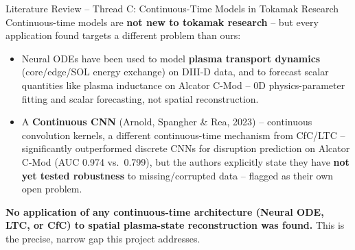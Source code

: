 \documentclass[aspectratio=169]{beamer}
\begin{document}
\begin{frame}{Literature Review -- Thread C: Continuous-Time Models in Tokamak Research}
  \small
  Continuous-time models are \textbf{not new to tokamak research} -- but
  every application found targets a different problem than ours:
  \begin{itemize}
    \item Neural ODEs have been used to model \textbf{plasma transport
      dynamics} (core/edge/SOL energy exchange) on DIII-D data, and to
      forecast scalar quantities like plasma inductance on Alcator C-Mod --
      0D physics-parameter fitting and scalar forecasting, not spatial
      reconstruction.
    \item A \textbf{Continuous CNN} (Arnold, Spangher \& Rea, 2023) --
      continuous convolution kernels, a different continuous-time mechanism
      from CfC/LTC -- significantly outperformed discrete CNNs for
      disruption prediction on Alcator C-Mod (AUC 0.974 vs.\ 0.799), but the
      authors explicitly state they have \textbf{not yet tested robustness}
      to missing/corrupted data -- flagged as their own open problem.
  \end{itemize}
  \vspace{6pt}
  \textbf{No application of any continuous-time architecture (Neural ODE,
  LTC, or CfC) to spatial plasma-state reconstruction was found.} This is
  the precise, narrow gap this project addresses.
\end{frame}
\end{document}
